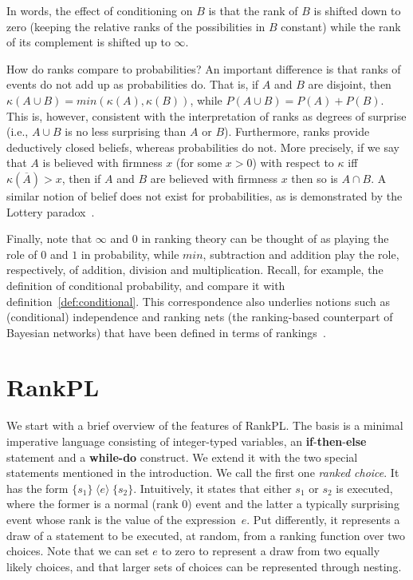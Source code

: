 \documentclass{llncs}
\newcommand{\Rank}[1]{\hspace{3pt} \pmb{\langle} #1 \pmb{\rangle}\hspace{3pt} } %
\begin{document}
In words, the effect of conditioning on $B$ is that the rank of $B$ is shifted down to zero (keeping the relative ranks of the possibilities in $B$ constant) 
	while the rank of its complement is shifted up to $\infty$.

How do ranks compare to probabilities?
An important difference is that ranks of events do not add up as probabilities do.
That is, if $A$ and $B$ are disjoint, then $\kappa(A \cup B) = min(\kappa(A), \kappa(B))$, while $P(A \cup B) = P(A) + P(B)$.
This is, however, consistent with the interpretation of ranks as degrees of surprise (i.e., $A \cup B$ is no less surprising than $A$ or $B$).
Furthermore, ranks provide deductively closed beliefs, whereas probabilities do not.
More precisely, if we say that $A$ is believed with firmness $x$ (for some $x > 0$) with respect to $\kappa$ iff $\kappa(\overline A) > x$, 
	then if $A$ and $B$ are believed with firmness $x$ then so is $A \cap B$.
A similar notion of belief does not exist for probabilities, as is demonstrated by the Lottery paradox~\cite{kyburg1961probability}.

Finally, note that $\infty$ and $0$ in ranking theory can be thought of as playing the role of $0$ and $1$ in probability,
	while $min$, subtraction and addition play the role, respectively, of addition, division and multiplication.
Recall, for example, the definition of conditional probability, and compare it with definition~\ref{def:conditional}.
This correspondence also underlies notions such as (conditional) independence and ranking nets (the ranking-based counterpart of Bayesian networks)
	that have been defined in terms of rankings~\cite{DBLP:books/daglib/0035277}.

\section{RankPL}\label{sec:rpl}

We start with a brief overview of the features of RankPL.
The basis is a minimal imperative language 
	consisting of integer-typed variables, an \textbf{if}-\textbf{then}-\textbf{else} statement and a \textbf{while-do} construct.
We extend it with the two special statements mentioned in the introduction.
We call the first one \emph{ranked choice}.
It has the form
$\{s_1\} \Rank{e} \{s_2\}.$
Intuitively, it states that either $s_1$ or $s_2$ is executed, 
	where the former is a normal (rank 0) event and the latter a typically surprising event whose rank is the value  
	of the expression~$e$.
Put differently, it represents a draw of a statement to be executed, at random, from a ranking function over two choices.
Note that we can set $e$ to zero to represent a draw from two equally likely choices,
	and that larger sets of choices can be represented through nesting.
\end{document}
